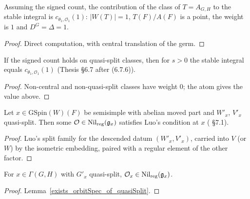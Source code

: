 \begin{lemma}
\label{atom_value}
\leanok
{}
Assuming the signed count, the contribution of the class of $T=A_{G,H}$ to the stable integral is
$c_{\theta_1,\mathcal O_1}(1)$: $|W(T)|=1$, $T(F)/A(F)$ is a point, the weight is $1$ and $D^G=\Delta=1$.
\end{lemma}
\begin{proof}
\leanok
{}
Direct computation, with central translation of the germ.
\end{proof}

\begin{proposition}
\label{mGeomStabS_eq_germ_one}
\leanok
{}
If the signed count holds on quasi-split classes, then for $s>0$ the stable integral equals
$c_{\theta_1,\mathcal O_1}(1)$ (Thesis \S6.7 after (6.7.6)).
\end{proposition}
\begin{proof}
\leanok
{}
Non-central and non-quasi-split classes have weight $0$; the atom gives the value above.
\end{proof}

\begin{lemma}
\label{exists_orbitSpec_of_quasiSplit}
\leanok
{}
Let $x\in\mathrm{GSpin}(W)(F)$ be semisimple with abelian moved part and $W'_x$, $V'_x$ quasi-split.
Then some $\mathcal O\in\mathrm{Nil}_{\mathrm{reg}}(\mathfrak g_x)$ satisfies Luo's condition at $x$ (\cite{Luo} \S7.1).
\end{lemma}
\begin{proof}
\leanok
{}
Luo's split family for the descended datum $(W'_x,V'_x)$, carried into $V$ (or $W$) by the
isometric embedding, paired with a regular element of the other factor.
\end{proof}

\begin{lemma}
\label{orbitChoice_mem_nilReg_of_qd}
\leanok
{}
For $x\in\Gamma(G,H)$ with $G'_x$ quasi-split, $\mathcal O_x\in\mathrm{Nil}_{\mathrm{reg}}(\mathfrak g_x)$.
\end{lemma}
\begin{proof}
\leanok
{}
Lemma~\ref{exists_orbitSpec_of_quasiSplit}.
\end{proof}

